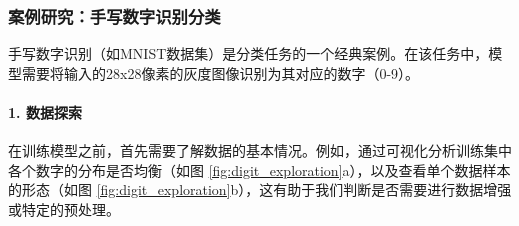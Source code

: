 \begin{itemize}
        \subsubsection*{案例研究：手写数字识别分类}
        \label{sssec:digit_classification_case_study}
        手写数字识别（如MNIST数据集）是分类任务的一个经典案例。在该任务中，模型需要将输入的28x28像素的灰度图像识别为其对应的数字（0-9）。

        \paragraph{1. 数据探索}
        在训练模型之前，首先需要了解数据的基本情况。例如，通过可视化分析训练集中各个数字的分布是否均衡（如图 \ref{fig:digit_exploration}a），以及查看单个数据样本的形态（如图 \ref{fig:digit_exploration}b），这有助于我们判断是否需要进行数据增强或特定的预处理。
        

\end{itemize}
